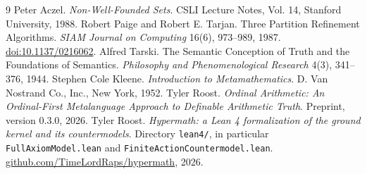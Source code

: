 \documentclass[11pt]{article}
\theoremstyle{definition}
\begin{document}
\begin{thebibliography}{9}
\small
{} Peter Aczel. \emph{Non-Well-Founded Sets}. CSLI Lecture Notes, Vol. 14, Stanford University, 1988.
 Robert Paige and Robert E. Tarjan. Three Partition Refinement Algorithms. \emph{SIAM Journal on Computing} 16(6), 973--989, 1987. \href{https://doi.org/10.1137/0216062}{doi:10.1137/0216062}.
 Alfred Tarski. The Semantic Conception of Truth and the Foundations of Semantics. \emph{Philosophy and Phenomenological Research} 4(3), 341--376, 1944.
 Stephen Cole Kleene. \emph{Introduction to Metamathematics}. D. Van Nostrand Co., Inc., New York, 1952.
 Tyler Roost. \emph{Ordinal Arithmetic: An Ordinal-First Metalanguage Approach to Definable Arithmetic Truth}. Preprint, version 0.3.0, 2026.
 Tyler Roost. \emph{Hypermath: a Lean 4 formalization of the ground kernel and its countermodels}. Directory \texttt{lean4/}, in particular \texttt{FullAxiomModel.lean} and \texttt{FiniteActionCountermodel.lean}. \href{https://github.com/TimeLordRaps/hypermath}{github.com/TimeLordRaps/hypermath}, 2026.
\end{thebibliography}
\end{document}
